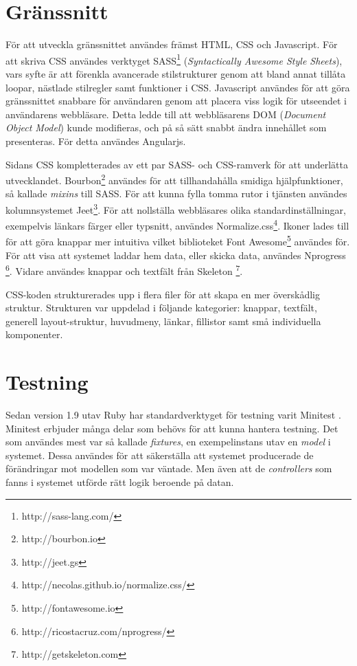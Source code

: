 \section{Gränssnitt}
För att utveckla gränssnittet användes främst HTML, CSS och Javascript. För att skriva CSS användes verktyget SASS\footnote{http://sass-lang.com/} (\textit{Syntactically Awesome Style Sheets}), vars syfte är att förenkla avancerade stilstrukturer genom att bland annat tillåta loopar, nästlade stilregler samt funktioner i CSS. Javascript användes för att göra gränssnittet snabbare för användaren genom att placera viss logik för utseendet i användarens webbläsare. Detta ledde till att webbläsarens DOM (\textit{Document Object Model}) kunde modifieras, och på så sätt snabbt ändra innehållet som presenteras. För detta användes Angularjs.

Sidans CSS kompletterades av ett par SASS- och CSS-ramverk för att underlätta utvecklandet. Bourbon\footnote{http://bourbon.io} användes för att tillhandahålla smidiga hjälpfunktioner, så kallade \textit{mixins} till SASS. För att kunna fylla tomma rutor i tjänsten användes kolumnsystemet Jeet\footnote{http://jeet.gs}. För att nollställa webbläsares olika standardinställningar, exempelvis länkars färger eller typsnitt, användes Normalize.css\footnote{http://necolas.github.io/normalize.css/}. Ikoner lades till för att göra knappar mer intuitiva vilket biblioteket Font Awesome\footnote{http://fontawesome.io}  användes för. För att visa att systemet laddar hem data, eller skicka data, användes Nprogress \footnote{http://ricostacruz.com/nprogress/}. Vidare användes knappar och textfält från Skeleton  \footnote{http://getskeleton.com}.

CSS-koden strukturerades upp i flera filer för att skapa en mer överskådlig struktur. Strukturen var uppdelad i följande kategorier: knappar, textfält, generell layout-struktur, huvudmeny, länkar, fillistor samt små individuella komponenter. 

\section{Testning}
Sedan version 1.9 utav Ruby har standardverktyget för testning varit Minitest \cite{rubychangelog}. Minitest erbjuder många delar som behövs för att kunna hantera testning. Det som användes mest var så kallade \textit{fixtures}, en exempelinstans utav en \textit{model} i systemet. Dessa användes för att säkerställa att systemet producerade de förändringar mot modellen som var väntade. Men även att de \textit{controllers} som fanns i systemet utförde rätt logik beroende på datan.

